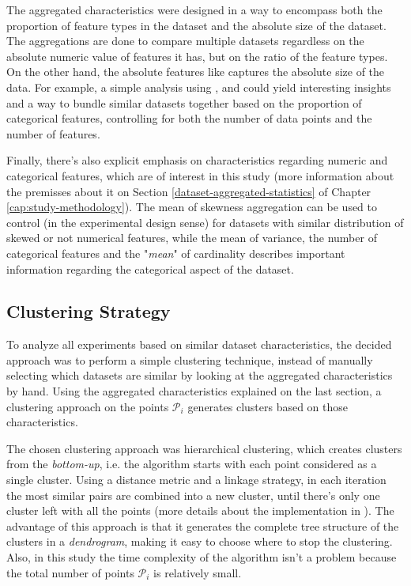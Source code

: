 The aggregated characteristics were designed in a way to encompass both the proportion of feature types in the dataset and the absolute size of the dataset. The  aggregations are done to compare multiple datasets regardless on the absolute numeric value of features it has, but on the ratio of the feature types. On the other hand, the absolute features like  captures the absolute size of the data. For example, a simple analysis using ,  and  could yield interesting insights and a way to bundle similar datasets together based on the proportion of categorical features, controlling for both the number of data points and the number of features. 

Finally, there's also explicit emphasis on characteristics regarding numeric and categorical features, which are of interest in this study (more information about the premisses about it on Section \ref{dataset-aggregated-statistics} of Chapter \ref{cap:study-methodology}). The mean of skewness aggregation can be used to control (in the experimental design sense) for datasets with similar distribution of skewed or not numerical features, while the mean of variance, the number of categorical features and the "\textit{mean}" of cardinality describes important information regarding the categorical aspect of the dataset.  

\subsection{Clustering Strategy}

To analyze all experiments based on similar dataset characteristics, the decided approach was to perform a simple clustering technique, instead of manually selecting which datasets are similar by looking at the aggregated characteristics by hand. Using the aggregated characteristics explained on the last section, a clustering approach on the points $\mathcal{P}_i$ generates clusters based on those characteristics.

The chosen clustering approach was hierarchical clustering, which creates clusters from the \textit{bottom-up}, i.e. the algorithm starts with each point considered as a single cluster. Using a distance metric and a linkage strategy, in each iteration the most similar pairs are combined into a new cluster, until there's only one cluster left with all the points (more details about the implementation in \cite{mullner2011modern}). The advantage of this approach is that it generates the complete tree structure of the clusters in a \textit{dendrogram}, making it easy to choose where to stop the clustering. Also, in this study the time complexity of the algorithm isn't a problem because the total number of points $\mathcal{P}_i$ is relatively small.

